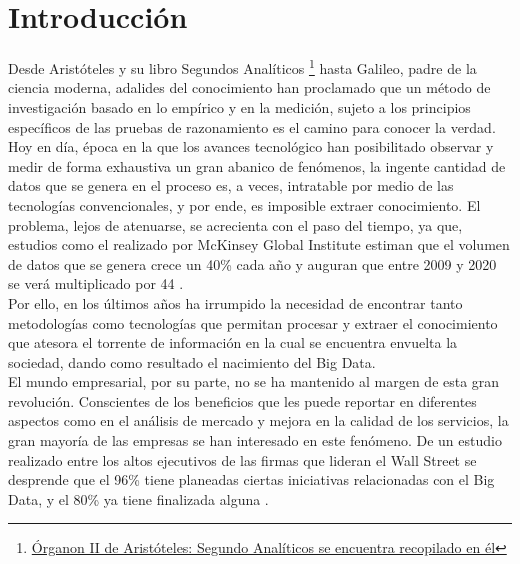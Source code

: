 
\pagestyle{fancy}

\chapter{Introducción}
\label{introduccion}

Desde Aristóteles y su libro Segundos Analíticos \footnote{\href{https://docs.google.com/a/datik.es/file/d/0By4kcbi6MzzdUHhVQnUtcTNUdk0/view}{Órganon II de Aristóteles: Segundo Analíticos se encuentra recopilado en él}} hasta Galileo, padre de la ciencia moderna, adalides del conocimiento han proclamado que un método de investigación basado en lo empírico y en la medición, sujeto a los principios específicos de las pruebas de razonamiento es el camino para conocer la verdad.\\

Hoy en día, época en la que los avances tecnológico han posibilitado observar y medir de forma exhaustiva un gran abanico de fenómenos, la ingente cantidad de datos que se genera en el proceso es, a veces, intratable por medio de las tecnologías convencionales, y por ende, es imposible extraer conocimiento. El problema, lejos de atenuarse, se acrecienta con el paso del tiempo, ya que, estudios como el realizado por McKinsey Global Institute estiman que el volumen de datos que se genera crece un 40\% cada año y auguran que entre 2009 y 2020 se verá multiplicado por 44 \cite{nambiartowards}.\\

Por ello, en los últimos años ha irrumpido la necesidad de encontrar tanto metodologías como tecnologías que permitan procesar y extraer el conocimiento que atesora el torrente de información en la cual se encuentra envuelta la sociedad, dando como resultado el nacimiento del Big Data.\\

El mundo empresarial, por su parte, no se ha mantenido al margen de esta gran revolución. Conscientes de los beneficios que les puede reportar en diferentes aspectos como en el análisis de mercado y mejora en la calidad de los servicios, la gran mayoría de las empresas se han interesado en este fenómeno. De un estudio realizado entre los altos ejecutivos de las firmas que lideran el Wall Street se desprende que el 96\% tiene planeadas ciertas iniciativas relacionadas con el Big Data, y el 80\% ya tiene finalizada alguna \cite{bdes:2013}. 


